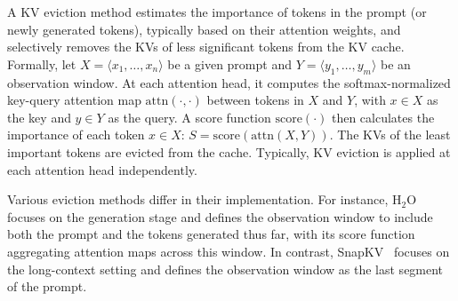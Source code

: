 A KV eviction method estimates the importance of tokens in the prompt (or newly generated tokens), typically based on their attention weights, and selectively removes the KVs of less significant tokens from the KV cache. Formally, let $X = \langle x_1, \ldots, x_n \rangle$ be a given prompt and $Y = \langle y_1, \ldots, y_m \rangle$ be an observation window. 
At each attention head, it computes the softmax-normalized key-query attention map $\mathrm{attn}(\cdot, \cdot)$ between tokens in $X$ and $Y$, with $x \in X$ as the key and $y \in Y$ as the query.
A score function $\mathrm{score}(\cdot)$ then calculates the importance of each token $x \in X$: $S = \mathrm{score}(\mathrm{attn}(X, Y))$. The KVs of the least important tokens are evicted from the cache. Typically, KV eviction is applied at each attention head independently.



Various eviction methods differ in their implementation. For instance, H$_2$O~\citep{h2o} focuses on the generation stage and defines the observation window to include both the prompt and the tokens generated thus far, with its score function aggregating attention maps across this window. In contrast, SnapKV~\citep{snapkv} focuses on the long-context setting and defines the observation window as the last segment of the prompt.







